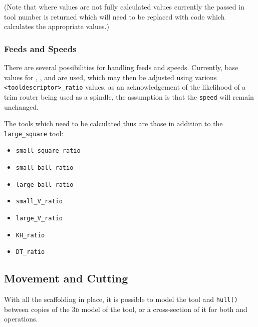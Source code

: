 \documentclass{ltxdoc}
\begin{document}
\noindent (Note that where values are not fully calculated values currently the passed in tool number is returned which will need to be replaced with code which calculates the appropriate values.)

\subsubsection{Feeds and Speeds}

There are several possibilities for handling feeds and speeds. Currently, base values for , , and  are used, which may then be adjusted using various \verb|<tooldescriptor>_ratio| values, as an acknowledgement of the likelihood of a trim router being used as a spindle, the assumption is that the \texttt{speed} will remain unchanged.


The tools which need to be calculated thus are those in addition to the \verb|large_square| tool:

\begin{itemize}
\item \verb|small_square_ratio|
\item \verb|small_ball_ratio|
\item \verb|large_ball_ratio|
\item \verb|small_V_ratio|
\item \verb|large_V_ratio|
\item \verb|KH_ratio|
\item \verb|DT_ratio|
\end{itemize}

\subsection{Movement and Cutting}

With all the scaffolding in place, it is possible to model the tool and \verb|hull()| between copies of the \textsc{3d} model of the tool, or a cross-section of it for both  and  operations.

\end{document}
